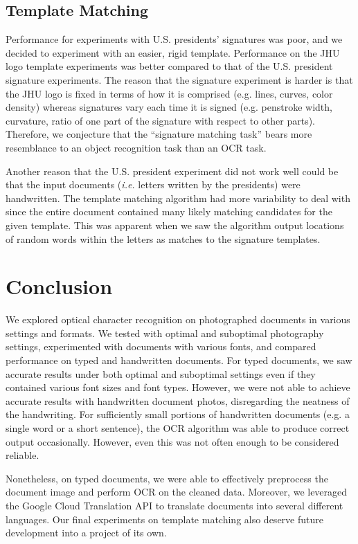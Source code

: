 \documentclass[11pt,letterpaper]{article}
\begin{document}
\subsection{Template Matching}

Performance for experiments with U.S. presidents' signatures was poor, and we decided to experiment with an easier, rigid template. Performance on the JHU logo template experiments was better compared to that of the U.S. president signature experiments. The reason that the signature experiment is harder is that the JHU logo is fixed in terms of how it is comprised (e.g. lines, curves, color density) whereas signatures vary each time it is signed (e.g. penstroke width, curvature, ratio of one part of the signature with respect to other parts). Therefore, we conjecture that the ``signature matching task'' bears more resemblance to an object recognition task than an OCR task.

Another reason that the U.S. president experiment did not work well could be that the input documents (\textit{i.e.} letters written by the presidents) were handwritten. The template matching algorithm had more variability to deal with since the entire document contained many likely matching candidates for the given template. This was apparent when we saw the algorithm output locations of random words within the letters as matches to the signature templates.

\section{Conclusion}

We explored optical character recognition on photographed documents in various settings and formats. We tested with optimal and suboptimal photography settings, experimented with documents with various fonts, and compared performance on typed and handwritten documents. For typed documents, we saw accurate results under both optimal and suboptimal settings even if they contained various font sizes and font types. However, we were not able to achieve accurate results with handwritten document photos, disregarding the neatness of the handwriting. For sufficiently small portions of handwritten documents (e.g. a single word or a short sentence), the OCR algorithm was able to produce correct output occasionally. However, even this was not often enough to be considered reliable. 

Nonetheless, on typed documents, we were able to effectively preprocess the document image and perform OCR on the cleaned data. Moreover, we leveraged the Google Cloud Translation API to translate documents into several different languages. Our final experiments on template matching also deserve future development into a project of its own.
\end{document}
